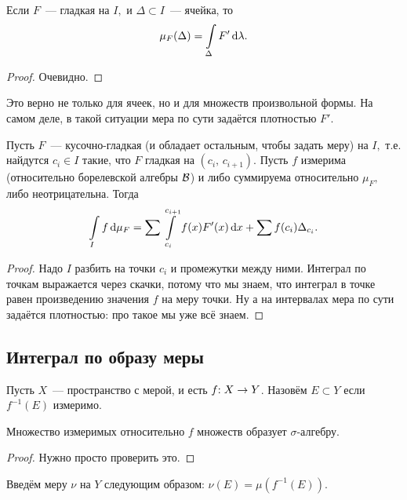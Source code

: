 \documentclass{notes}
\begin{document}
	\begin{st}
		Если $F$~--- гладкая на $I,$ и $\Delta \subset I$~--- ячейка, то
		\[
			\mu_F(\Delta) = \int\limits_{\Delta} F' \, \mathrm{d} \lambda.
		\]
		\begin{proof}
			Очевидно.
		\end{proof}
	\end{st}

	\begin{st}
		Это верно не только для ячеек, но и для множеств произвольной формы. На самом деле, в такой ситуации мера по сути задаётся плотностью $F'$.
	\end{st}

	\begin{thm}
		Пусть $F$~--- кусочно-гладкая (и обладает остальным, чтобы задать меру) на $I,$ т.е. найдутся $c_i \in I$ такие, что $F$ гладкая на $(c_i, \, c_{i+1})$. Пусть $f$ измерима (относительно борелевской алгебры $\mathcal{B}$) и либо суммируема относительно $\mu_F,$ либо неотрицательна. Тогда
		\[
			\int\limits_{I} f \, \mathrm{d} \mu_F = \sum \int\limits_{c_i}^{c_{i + 1}} f(x) F'(x) \, \mathrm{d} x + \sum f(c_i) \Delta_{c_i}.
		\]
		\begin{proof}
			Надо $I$ разбить на точки $c_i$ и промежутки между ними. Интеграл по точкам выражается через скачки, потому что мы знаем, что интеграл в точке равен произведению значения $f$ на меру точки. Ну а на интервалах мера по сути задаётся плотностью: про такое мы уже всё знаем.
		\end{proof}
 	\end{thm}

 \subsection{Интеграл по образу меры}
 	\begin{de}
 		Пусть $X$~--- пространство с мерой, и есть $f \text{\text{:}} \; X \to Y$. Назовём $E \subset Y$  если $f^{-1}(E)$ измеримо.
 	\end{de}

 	\begin{st}
 		Множество измеримых относительно $f$ множеств образует $\sigma$-алгебру.
 		\begin{proof}
 			Нужно просто проверить это.
 		\end{proof}
 	\end{st}

 	\begin{de}
 		Введём меру $\nu$ на $Y$ следующим образом: $\nu(E) = \mu(f^{-1}(E))$.
 	\end{de}
\end{document}
